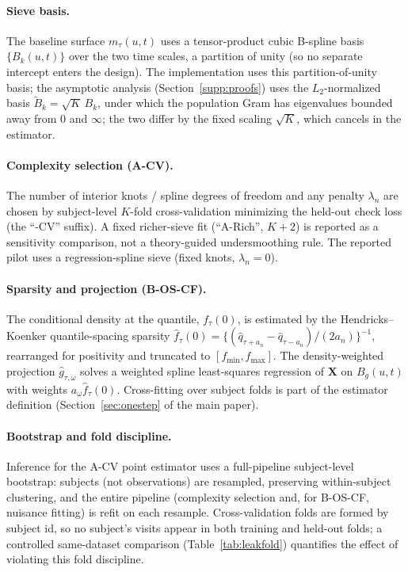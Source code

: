 \documentclass[11pt]{article}
\theoremstyle{remark}\newtheorem{remark}{Remark}
\newcommand{\X}{\bm{X}}
\begin{document}
\paragraph{Sieve basis.} The baseline surface $m_{\tau}(u,t)$ uses a tensor-product
cubic B-spline basis $\{B_k(u,t)\}$ over the two time scales, a partition of unity
(so no separate intercept enters the design). The implementation uses this
partition-of-unity basis; the asymptotic analysis (Section~\ref{supp:proofs}) uses
the $L_2$-normalized basis $\widetilde B_k=\sqrt K\,B_k$, under which the population
Gram has eigenvalues bounded away from $0$ and $\infty$; the two differ by the
fixed scaling $\sqrt K$, which cancels in the estimator.

\paragraph{Complexity selection (A-CV).} The number of interior knots / spline
degrees of freedom and any penalty $\lambda_n$ are chosen by subject-level
$K$-fold cross-validation minimizing the held-out check loss (the ``-CV'' suffix).
A fixed richer-sieve fit (``A-Rich'', $K{+}2$) is reported as a sensitivity
comparison, not a theory-guided undersmoothing rule. The reported pilot uses a
regression-spline sieve (fixed knots, $\lambda_n=0$).

\paragraph{Sparsity and projection (B-OS-CF).} The conditional density at the
quantile, $f_\tau(0)$, is estimated by the Hendricks--Koenker quantile-spacing
sparsity $\widehat f_\tau(0)=\{(\widehat q_{\tau+a_n}-\widehat q_{\tau-a_n})/(2a_n)\}^{-1}$,
rearranged for positivity and truncated to $[f_{\min},f_{\max}]$. The
density-weighted projection $\widehat g_{\tau,\omega}$ solves a weighted spline
least-squares regression of $\X$ on $B_g(u,t)$ with weights
$a_\omega\widehat f_\tau(0)$. Cross-fitting over subject folds is part of the
estimator definition (Section~\ref{sec:onestep} of the main paper).

\paragraph{Bootstrap and fold discipline.} Inference for the A-CV point estimator
uses a full-pipeline subject-level bootstrap: subjects (not observations) are
resampled, preserving within-subject clustering, and the entire pipeline
(complexity selection and, for B-OS-CF, nuisance fitting) is refit on each
resample. Cross-validation folds are formed by subject id, so no subject's visits
appear in both training and held-out folds; a controlled same-dataset comparison
(Table~\ref{tab:leakfold}) quantifies the effect of violating this fold discipline.
\end{document}

